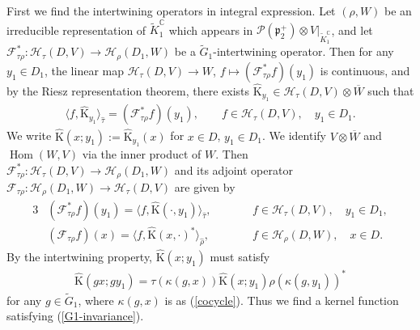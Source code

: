 \documentclass[11pt]{article}
\numberwithin{equation}{section}
\newcommand{\BC}{\mathbb{C}}
\newcommand{\fp}{\mathfrak{p}}
\newcommand{\cF}{\mathcal{F}}
\newcommand{\cH}{\mathcal{H}}
\newcommand{\cP}{\mathcal{P}}
\newcommand{\rK}{\mathrm{K}}
\newcommand{\Hom}{\operatorname{Hom}}
\begin{document}
First we find the intertwining operators in integral expression.
Let $(\rho,W)$ be an irreducible representation of $\tilde{K}_1^\BC$ which appears in $\cP(\fp^+_2)\otimes V|_{\tilde{K}_1^\BC}$,
and let $\cF_{\tau\rho}^*\colon \cH_\tau(D,V)\to \cH_{\rho}(D_1,W)$ be a $\tilde{G}_1$-intertwining operator.
Then for any $y_1\in D_1$, the linear map $\cH_\tau(D,V)\to W$, $f\mapsto (\cF_{\tau\rho}^* f)(y_1)$ is continuous,
and by the Riesz representation theorem, there exists $\hat{\rK}_{y_1}\in\cH_\tau(D,V)\otimes \overline{W}$ such that
\begin{gather*} \langle f,\hat{\rK}_{y_1}\rangle_{\hat{\tau}}=(\cF_{\tau\rho}^* f)(y_1), \qquad f\in\cH_\tau(D,V),\quad y_1\in D_1. \end{gather*}
We write $\hat{\rK}(x;y_1):=\hat{\rK}_{y_1}(x)$ for $x\in D$, $y_1\in D_1$.
We identify $V\otimes \overline{W}$ and $\Hom(W,V)$ via the inner product of $W$.
Then $\cF_{\tau\rho}^*\colon \cH_\tau(D,V)\to \cH_{\rho}(D_1,W)$ and its adjoint operator $\cF_{\tau\rho}\colon \cH_\rho(D_1,W)\to \cH_\tau(D,V)$ are given by
\begin{alignat*}{3}
&(\cF_{\tau\rho}^* f)(y_1)=\langle f,\hat{\rK}(\cdot,y_1)\rangle_{\hat{\tau}},\qquad && f\in\cH_\tau(D,V),\quad y_1\in D_1,\\
& (\cF_{\tau\rho} f)(x)=\langle f,\hat{\rK}(x,\cdot)^*\rangle_{\hat{\rho}}, \qquad && f\in\cH_\rho(D,W),\quad x\in D.
\end{alignat*}
By the intertwining property, $\hat{\rK}(x;y_1)$ must satisfy
\begin{gather}\label{G1-invariance}
\hat{\rK}(gx;gy_1)=\tau(\kappa(g,x))\hat{\rK}(x;y_1)\rho(\kappa(g,y_1))^*
\end{gather}
for any $g\in\tilde{G}_1$, where $\kappa(g,x)$ is as (\ref{cocycle}). Thus we find a kernel function satisfying (\ref{G1-invariance}).
\end{document}
